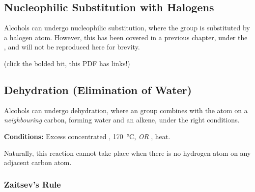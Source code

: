 



		\subsection{Nucleophilic Substitution with Halogens}

			Alcohols can undergo nucleophilic substitution, where the  group is substituted by a halogen atom. However, this
			has been covered in a previous chapter, under the \hyperlink{NSubAlcohols}{}, and will not
			be reproduced here for brevity.

			(click the bolded bit, this PDF has links!)



		\pagebreak
		\hypertarget{AlcoholDehydration}{}
		\subsection{Dehydration (Elimination of Water)}

			Alcohols can undergo dehydration, where an  group combines with the  atom on a \textit{neighbouring} carbon, forming
			water and an alkene, under the right conditions.

			\vspace{1.5em}
			\vbox{\textbf{Conditions:}	\tabto{35mm}Excess concentrated , \SI{170}{\celsius}, \textit{OR}
										\tabto{35mm}, heat.}


			Naturally, this reaction cannot take place when there is no hydrogen atom on any adjacent carbon atom.

			\subsubsection{Zaitsev's Rule}

